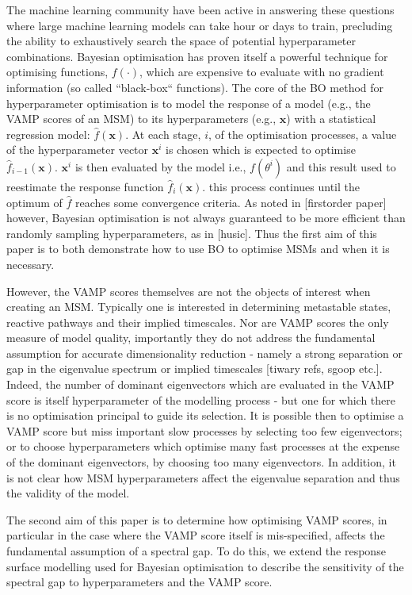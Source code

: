 \documentclass{article}
\begin{document}
The machine learning community have been active in answering these questions where large machine learning models can take hour or days to train, precluding the ability to exhaustively search the space of potential hyperparameter combinations.  Bayesian optimisation has proven itself a powerful technique for optimising functions, $f(\cdot)$, which are expensive to evaluate with no gradient information (so called ``black-box`` functions). The core of the BO method for hyperparameter optimisation is to model the response of a model (e.g., the VAMP scores of an MSM) to its hyperparameters (e.g., $\mathbf{x}$) with a statistical regression model: $\hat{f}(\mathbf{x})$. At each stage, $i$,  of the optimisation processes, a value of the hyperparameter vector $\mathbf{x}^{i}$ is chosen which is expected to optimise $\hat{f}_{i-1}(\mathbf{x})$. $\mathbf{x}^{i}$ is then evaluated by the model i.e., $f(\theta^{i})$ and this result used to reestimate the response function $\hat{f}_{i}(\mathbf{x})$.  this process continues until the optimum of $\hat{f}$ reaches some convergence criteria. As noted in [firstorder paper] however, Bayesian optimisation is not always guaranteed to be more efficient than randomly sampling hyperparameters, as in [husic].  Thus the first aim of this paper is to both demonstrate how to use BO to optimise MSMs and when it is necessary.  

However, the VAMP scores themselves are not the objects of interest when creating an MSM.  Typically one is interested in determining metastable states, reactive pathways and their implied timescales.  Nor are VAMP scores the only measure of model quality, importantly they do not address the fundamental assumption for accurate dimensionality reduction - namely a strong separation or gap in the eigenvalue spectrum or implied timescales [tiwary refs, sgoop etc.].  Indeed, the number of dominant eigenvectors which are evaluated in the VAMP score is itself  hyperparameter of the modelling process - but one for which there is no optimisation principal to guide its selection.  It is possible then to optimise a VAMP score but miss important slow processes by selecting too few eigenvectors; or to choose hyperparameters which optimise many fast processes at the expense of the dominant eigenvectors, by choosing too many eigenvectors. 
In addition, it is not clear how MSM hyperparameters affect the eigenvalue separation and thus the validity of the model.  

The second aim of this paper is to determine how optimising VAMP scores, in particular in the case where the VAMP score itself is mis-specified, affects the fundamental assumption of a spectral gap. To do this, we extend the response surface modelling used for Bayesian optimisation to describe the sensitivity of the spectral gap to hyperparameters and the VAMP score. 
\end{document}
